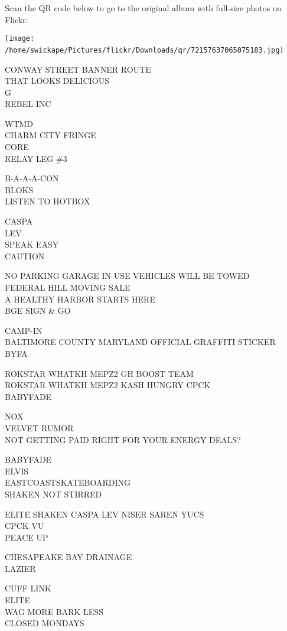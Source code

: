 \documentclass[10pt,letterpaper]{article}
\begin{document}
Scan the QR code below to go to the original album with full-size photos on Flickr:

\texttt{[image: /home/swickape/Pictures/flickr/Downloads/qr/72157637065075183.jpg]}
\

CONWAY STREET BANNER ROUTE\\
THAT LOOKS DELICIOUS\\
G\\
REBEL INC

WTMD\\
CHARM CITY FRINGE\\
CORE\\
RELAY LEG \#3

B{-}A{-}A{-}A{-}CON\\
BLOKS\\
LISTEN TO HOTBOX

CASPA\\
LEV\\
SPEAK EASY\\
CAUTION

NO PARKING GARAGE IN USE VEHICLES WILL BE TOWED\\
FEDERAL HILL MOVING SALE\\
A HEALTHY HARBOR STARTS HERE\\
BGE SIGN \& GO

CAMP{-}IN\\
BALTIMORE COUNTY MARYLAND OFFICIAL GRAFFITI STICKER\\
BYFA

ROKSTAR WHATKH MEPZ2 GH BOOST TEAM\\
ROKSTAR WHATKH MEPZ2 KASH HUNGRY CPCK\\
BABYFADE

NOX\\
VELVET RUMOR\\
NOT GETTING PAID RIGHT FOR YOUR ENERGY DEALS?

BABYFADE\\
ELVIS\\
EASTCOASTSKATEBOARDING\\
SHAKEN NOT STIRRED

ELITE SHAKEN CASPA LEV NISER SAREN YUCS\\
CPCK VU\\
PEACE UP

CHESAPEAKE BAY DRAINAGE\\
LAZIER

CUFF LINK\\
ELITE\\
WAG MORE BARK LESS\\
CLOSED MONDAYS
\end{document}
